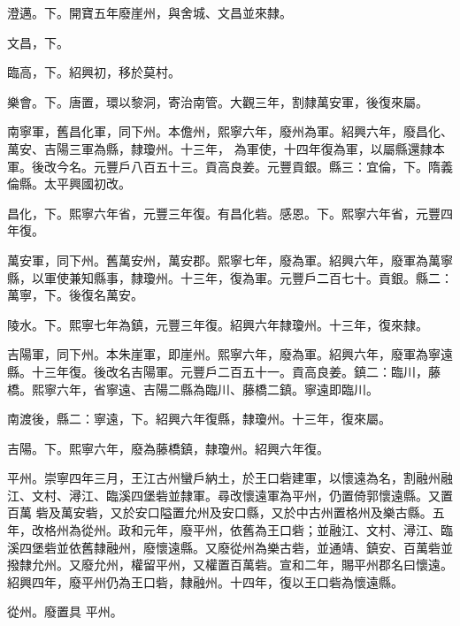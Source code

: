 \begin{pinyinscope}
 澄邁。下。開寶五年廢崖州，與舍城、文昌並來隸。



 文昌，下。



 臨高，下。紹興初，移於莫村。



 樂會。下。唐置，環以黎洞，寄治南管。大觀三年，割隸萬安軍，後復來屬。



 南寧軍，舊昌化軍，同下州。本儋州，熙寧六年，廢州為軍。紹興六年，廢昌化、萬安、吉陽三軍為縣，隸瓊州。十三年，
 為軍使，十四年復為軍，以屬縣還隸本軍。後改今名。元豐戶八百五十三。貢高良姜。元豐貢銀。縣三：宜倫，下。隋義倫縣。太平興國初改。



 昌化，下。熙寧六年省，元豐三年復。有昌化砦。感恩。下。熙寧六年省，元豐四年復。



 萬安軍，同下州。舊萬安州，萬安郡。熙寧七年，廢為軍。紹興六年，廢軍為萬寧縣，以軍使兼知縣事，隸瓊州。十三年，復為軍。元豐戶二百七十。貢銀。縣二：萬寧，下。後復名萬安。



 陵水。下。熙寧七年為鎮，元豐三年復。紹興六年隸瓊州。十三年，復來隸。



 吉陽軍，同下州。本朱崖軍，即崖州。熙寧六年，廢為軍。紹興六年，廢軍為寧遠縣。十三年復。後改名吉陽軍。元豐戶二百五十一。貢高良姜。鎮二：臨川，藤橋。熙寧六年，省寧遠、吉陽二縣為臨川、藤橋二鎮。寧遠即臨川。



 南渡後，縣二：寧遠，下。紹興六年復縣，隸瓊州。十三年，復來屬。



 吉陽。下。熙寧六年，廢為藤橋鎮，隸瓊州。紹興六年復。



 平州。崇寧四年三月，王江古州蠻戶納土，於王口砦建軍，以懷遠為名，割融州融江、文村、潯江、臨溪四堡砦並隸軍。尋改懷遠軍為平州，仍置倚郭懷遠縣。又置百萬
 砦及萬安砦，又於安口隘置允州及安口縣，又於中古州置格州及樂古縣。五年，改格州為從州。政和元年，廢平州，依舊為王口砦；並融江、文村、潯江、臨溪四堡砦並依舊隸融州，廢懷遠縣。又廢從州為樂古砦，並通靖、鎮安、百萬砦並撥隸允州。又廢允州，權留平州，又權置百萬砦。宣和二年，賜平州郡名曰懷遠。紹興四年，廢平州仍為王口砦，隸融州。十四年，復以王口砦為懷遠縣。



 從州。廢置具
 平州。




\end{pinyinscope}
